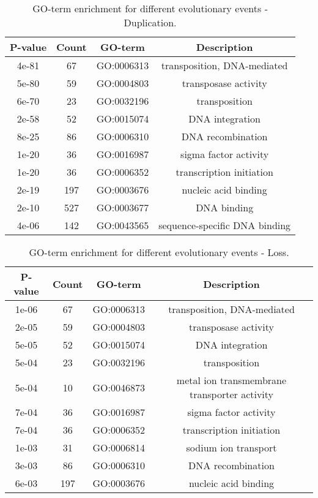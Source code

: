 \documentclass[english]{article}
\begin{document}
%
\begin{table}
\caption{\label{tab:go-events-duplication}GO-term enrichment for different
evolutionary events - Duplication.}
\begin{tabular}{cccc}
\hline 
P-value & Count & GO-term & Description \\
\hline 
4e-81 &  67 & GO:0006313 & transposition, DNA-mediated\\
5e-80 &  59 & GO:0004803 & transposase activity\\
6e-70 &  23 & GO:0032196 & transposition\\
2e-58 &  52 & GO:0015074 & DNA integration\\
8e-25 &  86 & GO:0006310 & DNA recombination\\
1e-20 &  36 & GO:0016987 & sigma factor activity\\
1e-20 &  36 & GO:0006352 & transcription initiation\\
2e-19 & 197 & GO:0003676 & nucleic acid binding\\
2e-10 & 527 & GO:0003677 & DNA binding\\
4e-06 & 142 & GO:0043565 & sequence-specific DNA binding\\
\hline 
\end{tabular}
\end{table}
\clearpage{}

%
\begin{table}
\caption{\label{tab:go-events-loss}GO-term enrichment for different
evolutionary events - Loss.}
\begin{tabular}{cccc}
\hline 
P-value & Count & GO-term & Description \\
\hline 
1e-06 &  67 & GO:0006313 & transposition, DNA-mediated\\
2e-05 &  59 & GO:0004803 & transposase activity\\
5e-05 &  52 & GO:0015074 & DNA integration\\
5e-04 &  23 & GO:0032196 & transposition\\
5e-04 &  10 & GO:0046873 & metal ion transmembrane transporter activity\\
7e-04 &  36 & GO:0016987 & sigma factor activity\\
7e-04 &  36 & GO:0006352 & transcription initiation\\
1e-03 &  31 & GO:0006814 & sodium ion transport\\
3e-03 &  86 & GO:0006310 & DNA recombination\\
6e-03 & 197 & GO:0003676 & nucleic acid binding\\
\hline 
\end{tabular}
\end{table}
\clearpage{}
\end{document}
